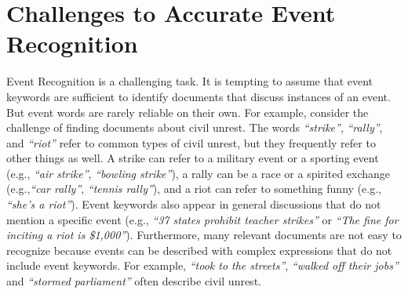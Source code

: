 \section{Challenges to Accurate Event Recognition}
\label{event-recognition-challenges}
{Event Recognition} is a challenging task. It is tempting to assume that event keywords are sufficient to
identify documents that discuss instances of an event. But event
words are rarely reliable on their own. For example, consider the challenge
of finding documents about civil unrest. The words {\it ``strike''},
{\it ``rally''}, and {\it ``riot''} refer to common types of civil unrest, but
they frequently refer to other things as well.  A  strike can refer
to a military event or a sporting event (e.g., {\it ``air
strike''}, {\it ``bowling strike''}), a rally can be a race or a
spirited exchange (e.g.,{\it ``car rally''}, {\it ``tennis rally''}), and a riot
can refer to something funny (e.g., {\it ``she's a riot''}).
Event keywords also appear in general discussions that do not
mention a specific event (e.g., {\it ``37 states
prohibit teacher strikes''} or {\it ``The fine for inciting a riot is \$1,000''}).  
Furthermore, many relevant documents are not easy to recognize
because events can be described with complex expressions that do not include 
event keywords. %
For example, 
{\it ``took to the streets''}, {\it ``walked off their jobs''} and {\it ``stormed
 parliament''} often describe civil unrest. 


